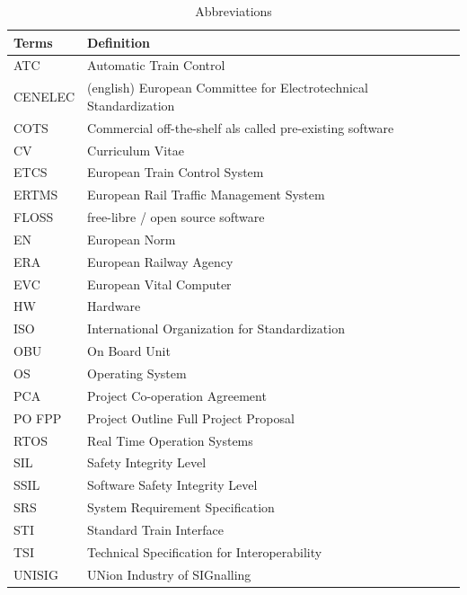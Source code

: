 \documentclass{template/openetcs_report}
\begin{document}
\begin{table} [h]
\begin{tabular}{|p{2cm}|p{12cm}|}
    \hline\hline
    \bfseries Terms & \bfseries Definition\\
    \hline\hline
    ATC & Automatic Train Control\\
    \hline
    CENELEC & (english) European Committee for Electrotechnical Standardization\\
    \hline
    COTS & Commercial off-the-shelf als called pre-existing software\\
    \hline
    CV & Curriculum Vitae\\
    \hline
    ETCS & European Train Control System\\
    \hline
    ERTMS & European Rail Traffic Management System\\
    \hline
    FLOSS & free-libre / open source software\\
    \hline
    EN & European Norm\\
    \hline
    ERA & European Railway Agency\\
    \hline
    EVC & European Vital Computer\\
    \hline
    HW & Hardware\\
    \hline
    ISO & International Organization for Standardization\\
    \hline
    OBU & On Board Unit\\
    \hline
    OS & Operating System\\
    \hline
    PCA & Project Co-operation Agreement\\
    \hline
    PO FPP & Project Outline Full Project Proposal\\
    \hline
    RTOS & Real Time Operation Systems\\
    \hline
    SIL & Safety Integrity Level\\
    \hline
    SSIL & Software Safety Integrity Level\\
    \hline
    SRS & System Requirement Specification \\
    \hline
    STI & Standard Train Interface \\
    \hline
    TSI & Technical Specification for Interoperability\\
    \hline
    UNISIG & UNion Industry of SIGnalling\\
\hline
\end{tabular}
\\
\caption{Abbreviations}
\end{table}
\end{document}
